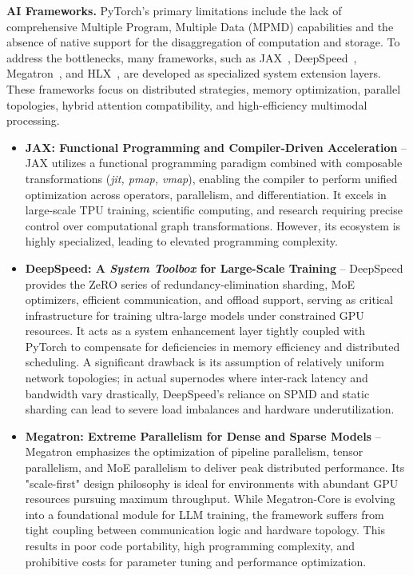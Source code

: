 \documentclass[11pt]{article}
\begin{document}
\noindent \textbf{AI Frameworks.} PyTorch's primary limitations include the lack of comprehensive Multiple Program, Multiple Data (MPMD) capabilities and the absence of native support for the disaggregation of computation and storage. To address the bottlenecks, many frameworks, such as JAX~\cite{jax2018github}, DeepSpeed~\cite{rasley2020deepspeed}, Megatron~\cite{shoeybi2019megatron}, and HLX~\cite{jung2025hlx}, are developed as specialized system extension layers. These frameworks focus on distributed strategies, memory optimization, parallel topologies, hybrid attention compatibility, and high-efficiency multimodal processing.


\begin{itemize}
    \item \textbf{JAX: Functional Programming and Compiler-Driven Acceleration} -- JAX utilizes a functional programming paradigm combined with composable transformations (\textit{jit, pmap, vmap}), enabling the compiler to perform unified optimization across operators, parallelism, and differentiation. It excels in large-scale TPU training, scientific computing, and research requiring precise control over computational graph transformations. However, its ecosystem is highly specialized, leading to elevated programming complexity.
    
    \item \textbf{DeepSpeed: A \textit{System Toolbox} for Large-Scale Training} -- DeepSpeed provides the ZeRO series of redundancy-elimination sharding, MoE optimizers, efficient communication, and offload support, serving as critical infrastructure for training ultra-large models under constrained GPU resources. It acts as a system enhancement layer tightly coupled with PyTorch to compensate for deficiencies in memory efficiency and distributed scheduling. A significant drawback is its assumption of relatively uniform network topologies; in actual supernodes where inter-rack latency and bandwidth vary drastically, DeepSpeed's reliance on SPMD and static sharding can lead to severe load imbalances and hardware underutilization.
    
    \item \textbf{Megatron: Extreme Parallelism for Dense and Sparse Models} -- Megatron emphasizes the optimization of pipeline parallelism, tensor parallelism, and MoE parallelism to deliver peak distributed performance. Its "scale-first" design philosophy is ideal for environments with abundant GPU resources pursuing maximum throughput. While Megatron-Core is evolving into a foundational module for LLM training, the framework suffers from tight coupling between communication logic and hardware topology. This results in poor code portability, high programming complexity, and prohibitive costs for parameter tuning and performance optimization.


\end{itemize}
\end{document}
